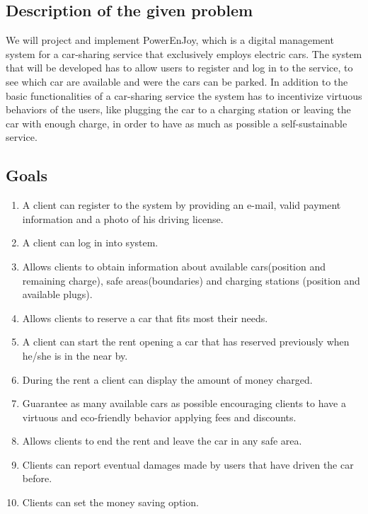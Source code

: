 
\subsection{Description of the given problem}
We will project and implement PowerEnJoy, which is a digital management system for a car-sharing service that exclusively employs electric cars.
The system that will be developed has to allow users to register and log in to the service, to see which car are available and were the cars can be parked. In addition to the basic functionalities of a car-sharing service the system has to incentivize virtuous behaviors of the users, like plugging the car to a charging station or leaving the car with enough charge, in order to have as much as possible a self-sustainable service.

\subsection{Goals}

\begin{enumerate}
\item A client can register to the system by providing an e-mail, valid payment information and a photo of his driving license.

\item A client can log in into system.

\item Allows clients to obtain information about available cars(position and remaining charge), safe areas(boundaries) and charging stations (position and available plugs).

\item Allows clients to reserve a car that fits most their needs.

\item A client can start the rent opening a car that has reserved previously when he/she is in the near by.

\item During the rent a client can display the amount of money charged.

\item Guarantee as many available cars as possible encouraging clients to have a virtuous and eco-friendly behavior applying fees and discounts.

\item Allows clients to end the rent and leave the car in any safe area.

\item Clients can report eventual damages made by users that have driven the car before. %

\item Clients can set the money saving option.


\end{enumerate}


